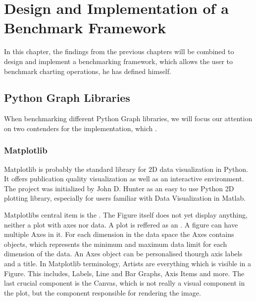 

\chapter{Design and Implementation of a Benchmark Framework}
\label{ch:application}

In this chapter, the findings from the previous chapters will be combined to
design and implement a benchmarking framework, which allows the user to
benchmark charting operations, he has defined himself. 





\section{Python Graph Libraries} \label{sec:application:libraries}

When benchmarking different Python Graph libraries, we will focus our attention
on two contenders for the implementation, which .

\subsection{Matplotlib} \label{sec:application:libraries:matplotlib}

Matplotlib is probably the standard library for 2D data visualization in Python.
It offers publication quality visualization as well as an interactive
environment. The project was initialized by John D. Hunter as an easy to use
Python 2D plotting library, especially for users familiar with Data
Visualization in Matlab.  \cite{Matplotlib, MatplotlibHistory}

Matplotlibs central item is the .
The Figure itself does not yet display anything, neither a plot with axes nor
data. A plot is reffered as an . A
figure can have multiple Axes in it. For each dimension in the data space the
Axes contains  objects, which
represents the minimum and maximum data limit for each dimension of the data. An
Axes object can be personalised thourgh axis labels and a title. In Matplotlib
terminology, Artists are everything which is visible in a Figure. This includes,
Labels, Line and Bar Graphs, Axis Items and more. The last crucial component is
the Canvas, which is not really a visual component in the plot, but the
component responsible for rendering the image.

